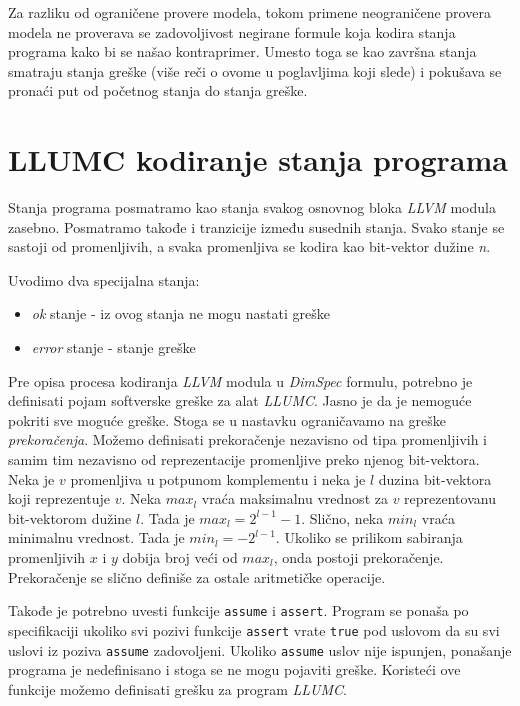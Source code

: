 \documentclass[a4paper]{article}
\theoremstyle{plain}
\theoremstyle{definition}
\begin{document}
Za razliku od ograničene provere modela, tokom primene neograničene provera modela ne proverava se zadovoljivost negirane formule koja kodira stanja programa kako bi se našao kontraprimer. Umesto toga se kao završna stanja smatraju stanja greške (više reči o ovome u poglavljima koji slede) i pokušava se pronaći put od početnog stanja do stanja greške.


\section{LLUMC kodiranje stanja programa}
\label{sec:LLUMCkodiranje}

Stanja programa posmatramo kao stanja svakog osnovnog bloka \emph{LLVM} modula zasebno. Posmatramo takođe i tranzicije između susednih stanja. Svako stanje se sastoji od promenljivih, a svaka promenljiva se kodira kao bit-vektor dužine \emph{n}.

Uvodimo dva specijalna stanja:
\begin{itemize}
    \item \emph{ok} stanje - iz ovog stanja ne mogu nastati greške
    \item \emph{error} stanje - stanje greške
\end{itemize}

Pre opisa procesa kodiranja \emph{LLVM} modula u \emph{DimSpec} formulu, potrebno je definisati pojam softverske greške za alat \emph{LLUMC}. Jasno je da je nemoguće pokriti sve moguće greške. Stoga se u nastavku ograničavamo na greške \emph{prekoračenja}. Možemo definisati prekoračenje nezavisno od tipa promenljivih i samim tim nezavisno od reprezentacije promenljive preko njenog bit-vektora. Neka je $v$ promenljiva u potpunom komplementu i neka je $l$ duzina bit-vektora koji reprezentuje $v$. Neka $max_{l}$ vraća maksimalnu vrednost za $v$ reprezentovanu bit-vektorom dužine $l$. Tada je $max_{l} = 2^{l-1}-1$. Slično, neka $min_{l}$ vraća minimalnu vrednost. Tada je $min_{l} = -2^{l-1}$. Ukoliko se prilikom sabiranja promenljivih $x$ i $y$ dobija broj veći od $max_{l}$, onda postoji prekoračenje. Prekoračenje se slično definiše za ostale aritmetičke operacije.

Takođe je potrebno uvesti funkcije \texttt{assume} i \texttt{assert}. Program se ponaša po specifikaciji ukoliko svi pozivi funkcije \texttt{assert} vrate \texttt{true} pod uslovom da su svi uslovi iz poziva \texttt{assume} zadovoljeni. Ukoliko \texttt{assume} uslov nije ispunjen, ponašanje programa je nedefinisano i stoga se ne mogu pojaviti greške. Koristeći ove funkcije možemo definisati grešku za program \emph{LLUMC}.
\end{document}
